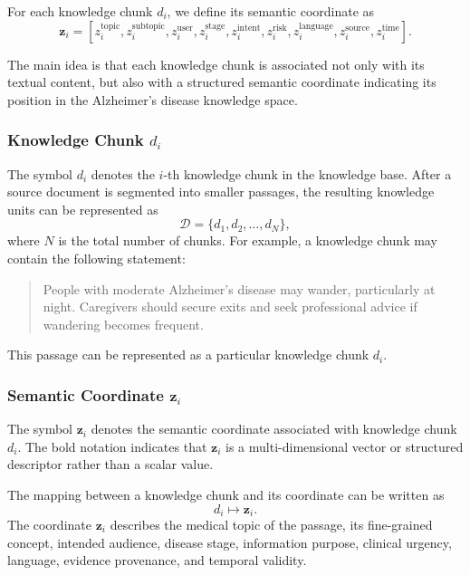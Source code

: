 \documentclass{article}
\begin{document}
For each knowledge chunk $d_i$, we define its semantic coordinate as
\begin{equation}
    \mathbf{z}_i =
    \left[
    z_i^{\mathrm{topic}},
    z_i^{\mathrm{subtopic}},
    z_i^{\mathrm{user}},
    z_i^{\mathrm{stage}},
    z_i^{\mathrm{intent}},
    z_i^{\mathrm{risk}},
    z_i^{\mathrm{language}},
    z_i^{\mathrm{source}},
    z_i^{\mathrm{time}}
    \right].
\end{equation}

The main idea is that each knowledge chunk is associated not only with its
textual content, but also with a structured semantic coordinate indicating its position in the Alzheimer's disease knowledge space.

\subsubsection{Knowledge Chunk $d_i$}
The symbol $d_i$ denotes the $i$-th knowledge chunk in the knowledge base. After a source document is segmented into smaller passages, the resulting knowledge units can be represented as
\begin{equation}
    \mathcal{D} = \{d_1,d_2,\ldots,d_N\},
\end{equation}
where $N$ is the total number of chunks.
For example, a knowledge chunk may contain the following statement:
\begin{quote}
People with moderate Alzheimer's disease may wander, particularly at night.
Caregivers should secure exits and seek professional advice if wandering
becomes frequent.
\end{quote}
This passage can be represented as a particular knowledge chunk $d_i$.

\subsubsection{Semantic Coordinate $\mathbf{z}_i$}
The symbol $\mathbf{z}_i$ denotes the semantic coordinate associated with knowledge chunk $d_i$. The bold notation indicates that $\mathbf{z}_i$ is a multi-dimensional vector or structured descriptor rather than a scalar value.

The mapping between a knowledge chunk and its coordinate can be written as
\begin{equation}
    d_i \longmapsto \mathbf{z}_i.
\end{equation}
The coordinate $\mathbf{z}_i$ describes the medical topic of the passage, its fine-grained concept, intended audience, disease stage, information purpose, clinical urgency, language, evidence provenance, and temporal validity.
\end{document}
